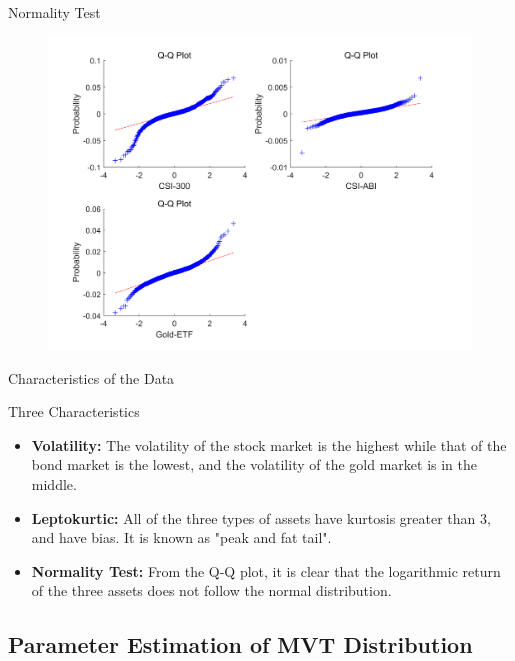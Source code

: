 \documentclass{beamer}
\begin{document}
\begin{frame}{Normality Test}
\begin{figure}[H]
    \centering
    \includegraphics[scale=0.5]{Figure/FIG2-Q-Q.png}
    \label{Fig2}
\end{figure}
\end{frame}

\begin{frame}{Characteristics of the Data}
\begin{block}{Three Characteristics}
\begin{itemize}
    \item \textbf{Volatility:} The volatility of the stock market is the highest while that of the bond market is the lowest, and the volatility of the gold market is in the middle.
    \item \textbf{Leptokurtic:} All of the three types of assets have kurtosis greater than 3, and have bias. It is known as "peak and fat tail".
    \item \textbf{Normality Test:} From the Q-Q plot, it is clear that the logarithmic return of the three assets does not follow the normal distribution. 
\end{itemize}
\end{block}

\end{frame}



\subsection{Parameter Estimation of MVT Distribution}
\end{document}
